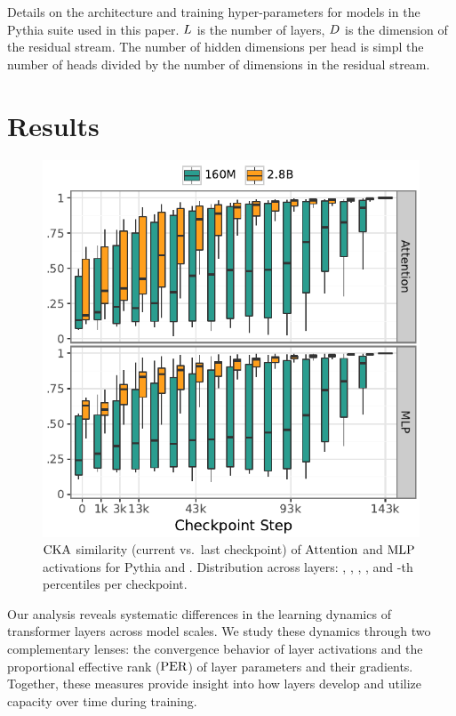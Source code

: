 \begin{table}[!t]
    \centering
    
    \caption{Details on the architecture and training hyper-parameters for models in the Pythia suite used in this paper. $L$ is the number of layers, $D$ is the dimension of the residual stream. The number of hidden dimensions per head is simpl the number of heads divided by the number of dimensions in the residual stream.}
    \label{tab:model_hparams}
\end{table}


\section{Results}
\label{sec:tending-towards-stability-results}

\begin{figure}
    \vspace{-36pt}
    \centering
    \includegraphics[width=0.54\columnwidth]{chapters/tending-towards-stability/figures/cka_main_plot.pdf}
    \caption{$\mathrm{CKA}$ similarity (current vs.\ last checkpoint) of $\mathrm{Attention}$ and $\mathrm{MLP}$ activations for Pythia \sixmil and \twobil. Distribution across layers: , , , , and -th percentiles per checkpoint.}
    \label{fig:cka_main_plot}
\end{figure}

Our analysis reveals systematic differences in the learning dynamics of transformer layers across model scales. We study these dynamics through two complementary lenses: the convergence behavior of layer activations and the proportional effective rank ($\mathrm{PER}$) of layer parameters and their gradients. Together, these measures provide insight into how layers develop and utilize capacity over time during training.

